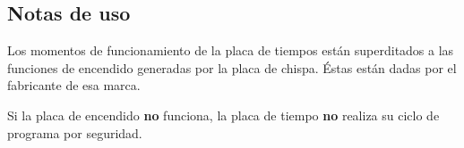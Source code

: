 \documentclass{article}
\begin{document}
\subsection*{Notas de uso}
Los momentos de funcionamiento de la placa de tiempos están superditados a las funciones de encendido generadas por la placa de chispa. Éstas están dadas por el fabricante de esa marca.\par Si la placa de encendido \textbf{no} funciona, la placa de tiempo \textbf{no} realiza su ciclo de programa por seguridad.
\end{document}
